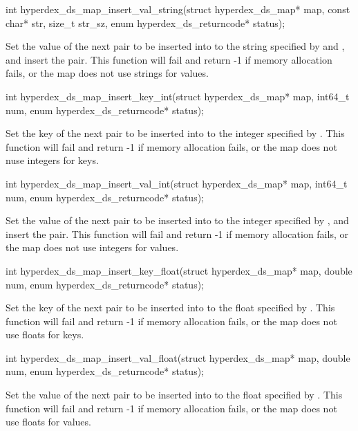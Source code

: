 \funcsep
\begin{ccode}
int hyperdex_ds_map_insert_val_string(struct hyperdex_ds_map* map,
                                      const char* str, size_t str_sz,
                                      enum hyperdex_ds_returncode* status);
\end{ccode}
\funcdesc Set the value of the next pair to be inserted into  to the
string specified by  and , and insert the pair.  This
function will fail and return -1 if memory allocation fails, or the map does not
use strings for values.

\funcsep
\begin{ccode}
int hyperdex_ds_map_insert_key_int(struct hyperdex_ds_map* map,
                                   int64_t num,
                                   enum hyperdex_ds_returncode* status);
\end{ccode}
\funcdesc Set the key of the next pair to be inserted into  to the
integer specified by .  This function will fail and return -1 if
memory allocation fails, or the map does not nuse integers for keys.

\funcsep
\begin{ccode}
int hyperdex_ds_map_insert_val_int(struct hyperdex_ds_map* map,
                                   int64_t num,
                                   enum hyperdex_ds_returncode* status);
\end{ccode}
\funcdesc Set the value of the next pair to be inserted into  to the
integer specified by , and insert the pair.  This function will fail
and return -1 if memory allocation fails, or the map does not use integers for
values.

\funcsep
\begin{ccode}
int hyperdex_ds_map_insert_key_float(struct hyperdex_ds_map* map,
                                     double num,
                                     enum hyperdex_ds_returncode* status);
\end{ccode}
\funcdesc Set the key of the next pair to be inserted into  to the
float specified by .  This function will fail and return -1 if memory
allocation fails, or the map does not use floats for keys.

\funcsep
\begin{ccode}
int hyperdex_ds_map_insert_val_float(struct hyperdex_ds_map* map,
                                     double num,
                                     enum hyperdex_ds_returncode* status);
\end{ccode}
\funcdesc Set the value of the next pair to be inserted into  to the
float specified by .  This function will fail and return -1 if memory
allocation fails, or the map does not use floats for values.

